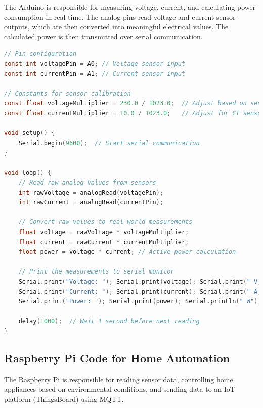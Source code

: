 \documentclass[a4paper,12pt]{report}
\begin{document}
The Arduino is responsible for measuring voltage, current, and calculating power consumption in real-time. The analog pins read voltage and current sensor outputs, which are then converted into meaningful electrical values. The calculated power is then transmitted over serial communication.
\clearpage

\begin{lstlisting}[language=C,caption={arduino code for energy calculations}]
// Pin configuration
const int voltagePin = A0; // Voltage sensor input
const int currentPin = A1; // Current sensor input

// Constants for sensor calibration
const float voltageMultiplier = 230.0 / 1023.0;  // Adjust based on sensor specs
const float currentMultiplier = 10.0 / 1023.0;   // Adjust for CT sensor scaling

void setup() {
    Serial.begin(9600);  // Start serial communication
}

void loop() {
    // Read raw analog values from sensors
    int rawVoltage = analogRead(voltagePin);
    int rawCurrent = analogRead(currentPin);
    
    // Convert raw values to real-world measurements
    float voltage = rawVoltage * voltageMultiplier;
    float current = rawCurrent * currentMultiplier;
    float power = voltage * current; // Active power calculation

    // Print the measurements to serial monitor
    Serial.print("Voltage: "); Serial.print(voltage); Serial.print(" V, ");
    Serial.print("Current: "); Serial.print(current); Serial.print(" A, ");
    Serial.print("Power: "); Serial.print(power); Serial.println(" W");

    delay(1000);  // Wait 1 second before next reading
}
\end{lstlisting}


\subsection{Raspberry Pi Code for Home Automation}

The Raspberry Pi is responsible for reading sensor data, controlling home appliances based on environmental conditions, and sending data to an IoT platform (ThingsBoard) using MQTT.
\clearpage
\end{document}
